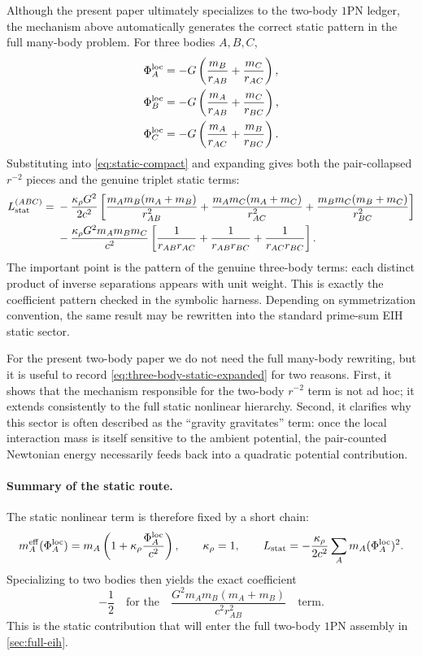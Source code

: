 \documentclass[11pt]{article}
\newcommand{\krho}{\kappa_{\rho}}
\begin{document}
Although the present paper ultimately specializes to the two-body \(1\)PN ledger, the
mechanism above automatically generates the correct static pattern in the full many-body
problem. For three bodies \(A,B,C\),
\begin{align}
\Phi_A^{\rm loc} &= -G\left(\frac{m_B}{r_{AB}}+\frac{m_C}{r_{AC}}\right), \nonumber\\
\Phi_B^{\rm loc} &= -G\left(\frac{m_A}{r_{AB}}+\frac{m_C}{r_{BC}}\right), \nonumber\\
\Phi_C^{\rm loc} &= -G\left(\frac{m_A}{r_{AC}}+\frac{m_B}{r_{BC}}\right).
\label{eq:three-body-local-potentials}
\end{align}
Substituting into \eqref{eq:static-compact} and expanding gives both the pair-collapsed
\(r^{-2}\) pieces and the genuine triplet static terms:
\begin{align}
L_{\rm stat}^{(ABC)}
={}&
-\frac{\krho G^2}{2c^2}
\left[
\frac{m_A m_B(m_A+m_B)}{r_{AB}^2}
+
\frac{m_A m_C(m_A+m_C)}{r_{AC}^2}
+
\frac{m_B m_C(m_B+m_C)}{r_{BC}^2}
\right]
\nonumber\\
&
-\frac{\krho G^2 m_A m_B m_C}{c^2}
\left[
\frac{1}{r_{AB}r_{AC}}
+
\frac{1}{r_{AB}r_{BC}}
+
\frac{1}{r_{AC}r_{BC}}
\right].
\label{eq:three-body-static-expanded}
\end{align}
The important point is the pattern of the genuine three-body terms: each distinct product
of inverse separations appears with unit weight. This is exactly the coefficient pattern
checked in the symbolic harness. Depending on symmetrization convention, the same result
may be rewritten into the standard prime-sum EIH static sector.

For the present two-body paper we do not need the full many-body rewriting, but it is
useful to record \eqref{eq:three-body-static-expanded} for two reasons. First, it shows
that the mechanism responsible for the two-body \(r^{-2}\) term is not ad hoc; it extends
consistently to the full static nonlinear hierarchy. Second, it clarifies why this sector
is often described as the ``gravity gravitates'' term: once the local interaction mass is
itself sensitive to the ambient potential, the pair-counted Newtonian energy necessarily
feeds back into a quadratic potential contribution.

\paragraph{Summary of the static route.}
The static nonlinear term is therefore fixed by a short chain:
\begin{equation}
m_A^{\rm eff}(\Phi_A^{\rm loc})
=
m_A\left(1+\krho\frac{\Phi_A^{\rm loc}}{c^2}\right),
\qquad
\krho=1,
\qquad
L_{\rm stat}
=
-\frac{\krho}{2c^2}\sum_A m_A(\Phi_A^{\rm loc})^2.
\label{eq:static-route-summary}
\end{equation}
Specializing to two bodies then yields the exact coefficient
\begin{equation}
-\frac12
\quad\text{for the}\quad
\frac{G^2m_A m_B(m_A+m_B)}{c^2 r_{AB}^2}
\quad\text{term.}
\end{equation}
This is the static contribution that will enter the full two-body \(1\)PN assembly in
\cref{sec:full-eih}.
\end{document}
